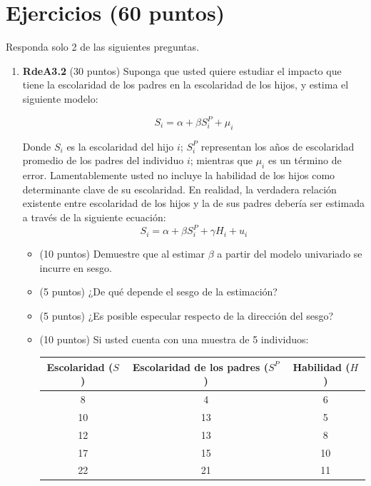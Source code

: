 \documentclass[10pt,a4paper]{article}
\begin{document}
\section{Ejercicios (60 puntos)}

Responda solo 2 de las siguientes preguntas.
\begin{enumerate}
      \item \textbf{RdeA3.2} (30 puntos) 
      Suponga que usted quiere estudiar el impacto que tiene la escolaridad de los padres en la escolaridad de los hijos, y estima el siguiente modelo:

\begin{equation}
    S_i = \alpha + \beta S^P_i + \mu_i
\end{equation}


      Donde $S_i$ es la escolaridad del hijo $i$; $S^P_i$ representan los años de escolaridad promedio de los padres del individuo $i$; mientras que $\mu_i$ es un término de error. Lamentablemente usted no incluye la habilidad de los hijos como determinante clave de su escolaridad. En realidad, la verdadera relación existente entre escolaridad de los hijos y la de sus padres debería ser estimada a través de la siguiente ecuación:
\begin{equation}
    S_i = \alpha + \beta S^P_i + \gamma H_i + u_i
\end{equation}

        \begin{itemize}
            \item [a)] (10 puntos) Demuestre que al estimar $\beta$ a partir del modelo univariado se incurre en sesgo.

            

            \item [b)] (5 puntos) ¿De qué depende el sesgo de la estimación?
            \item [c)] (5 puntos) ¿Es posible especular respecto de la dirección del sesgo?


            \item [d)] (10 puntos) Si usted cuenta con una muestra de 5 individuos:

            \begin{table}[H]
                \centering
                \begin{tabular}{c|c|c}
                 Escolaridad ($S$) & Escolaridad de los padres ($S^P$)& Habilidad ($H$) \\ \hline
                 8&4&6\\  
                 10&13&5\\ 
                 12&13&8\\ 
                 17&15&10\\ 
                 22&21&11\\ 
                \end{tabular}
                \label{tab:placeholder}
            \end{table}


\end{itemize}
\end{enumerate}
\end{document}
